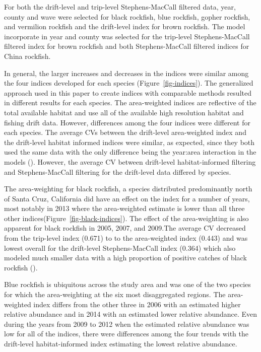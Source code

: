 \documentclass[
  12pt,
  authoryear,
  preprint,
  3p]{elsarticle}
\begin{document}
For both the drift-level and trip-level Stephens-MacCall filtered data,
year, county and wave were selected for black rockfish, blue rockfish,
gopher rockfish, and vermilion rockfish and the drift-level index for
brown rockfish. The model incorporate in year and county was selected
for the trip-level Stephens-MacCall filtered index for brown rockfish
and both Stephens-MacCall filtered indices for China rockfish.

In general, the larger increases and decreases in the indices were
similar among the four indices developed for each species
(Figure~\ref{fig-indices}). The generalized approach used in this paper
to create indices with comparable methods resulted in different results
for each species. The area-weighted indices are reflective of the total
available habitat and use all of the available high resolution habitat
and fishing drift data. However, differences among the four indices were
different for each species. The average CVs between the drift-level
area-weighted index and the drift-level habitat informed indices were
similar, as expected, since they both used the same data with the only
difference being the year:area interaction in the models
(\citet{tab-avgcv}). However, the average CV between drift-level
habitat-informed filtering and Stephens-MacCall filtering for the
drift-level data differed by species.

The area-weighting for black rockfish, a species distributed
predominantly north of Santa Cruz, California did have an effect on the
index for a number of years, most notably in 2013 where the
area-weighted estimate is lower than all three other
indices(Figure~\ref{fig-black-indices}). The effect of the
area-weighting is also apparent for black rockfish in 2005, 2007, and
2009.The average CV decreased from the trip-level index (0.671) to to
the area-weighted index (0.443) and was lowest overall for the
drift-level Stephens-MacCall index (0.364) which also modeled much
smaller data with a high proportion of positive catches of black
rockfish (\citet{tab-samplesize}).

Blue rockfish is ubiquitous across the study area and was one of the two
species for which the area-weighting at the six most disaggregated
regions. The area-weighted index differs from the other three in 2006
with an estimated higher relative abundance and in 2014 with an
estimated lower relative abundance. Even during the years from 2009 to
2012 when the estimated relative abundance was low for all of the
indices, there were differences among the four trends with the
drift-level habitat-informed index estimating the lowest relative
abundance.
\end{document}
